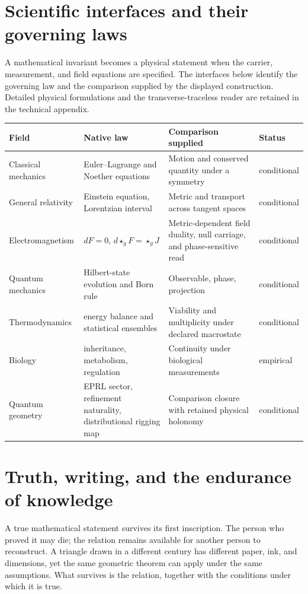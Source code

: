 \documentclass[10pt]{article}
\begin{document}
\section{Scientific interfaces and their governing laws}\label{sec:interfaces}
A mathematical invariant becomes a physical statement when the carrier, measurement, and field equations are specified. The interfaces below identify the governing law and the comparison supplied by the displayed construction. Detailed physical formulations and the transverse-traceless reader are retained in the technical appendix.
\small
\begin{longtable}{@{}p{.19\linewidth}p{.27\linewidth}p{.31\linewidth}p{.12\linewidth}@{}}
\toprule Field & Native law & Comparison supplied & Status \\ \midrule\endhead
Classical mechanics & Euler--Lagrange and Noether equations & Motion and conserved quantity under a symmetry & conditional \\
General relativity & Einstein equation, Lorentzian interval & Metric and transport across tangent spaces & conditional \\
Electromagnetism & $dF=0$, $d\star_gF=\star_gJ$ & Metric-dependent field duality, null carriage, and phase-sensitive read & conditional \\
Quantum mechanics & Hilbert-state evolution and Born rule & Observable, phase, projection & conditional \\
Thermodynamics & energy balance and statistical ensembles & Viability and multiplicity under declared macrostate & conditional \\
Biology & inheritance, metabolism, regulation & Continuity under biological measurements & empirical \\
Quantum geometry & EPRL sector, refinement naturality, distributional rigging map & Comparison closure with retained physical holonomy & conditional \\
\bottomrule
\end{longtable}
\normalsize
\section{Truth, writing, and the endurance of knowledge}
A true mathematical statement survives its first inscription. The person who proved it may die; the relation remains available for another person to reconstruct. A triangle drawn in a different century has different paper, ink, and dimensions, yet the same geometric theorem can apply under the same assumptions. What survives is the relation, together with the conditions under which it is true.
\end{document}
